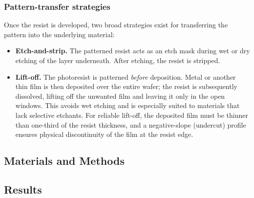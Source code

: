 \subsubsection*{Pattern-transfer strategies}

Once the resist is developed, two broad strategies exist for
transferring the pattern into the
underlying material:
\begin{itemize}
  \item \textbf{Etch-and-strip.} The patterned resist acts as an etch
    mask during wet or dry
    etching of the layer underneath. After etching, the resist is stripped.
  \item \textbf{Lift-off.} The photoresist is patterned \emph{before}
    deposition. Metal or
    another thin film is then deposited over the entire wafer; the
    resist is subsequently
    dissolved, lifting off the unwanted film and leaving it only in
    the open windows. This
    avoids wet etching and is especially suited to materials that
    lack selective etchants.
    For reliable lift-off, the deposited film must be thinner than
    one-third of the resist
    thickness, and a negative-slope (undercut) profile ensures
    physical discontinuity of the
    film at the resist edge.
\end{itemize}

\subsection{Materials and Methods}


\subsection{Results}

